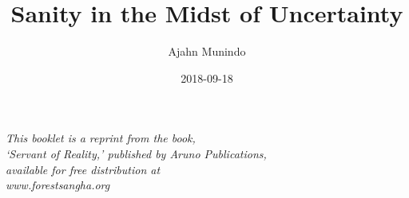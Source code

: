 \documentclass[
  final,
  babelLanguage=british,
]{anecdote}
\title{Sanity in the Midst of Uncertainty}
\subtitle{}
\author{Ajahn Munindo}
\date{2018-09-18}
\begin{document}
\frontmatter

\ifdesktopversion
{}
\fi




%

\clearpage

\mbox{}\thispagestyle{empty}
\vfill

{\centering
\par}

\vfill

{\centering\itshape\fontsize{9}{13}\selectfont
This booklet is a reprint from the book,\\
`Servant of Reality,' published by Aruno Publications,\\
available for free distribution at\\
www.forestsangha.org
\par}

\clearpage\mbox{}\thispagestyle{empty}

\clearpage\mbox{}\thispagestyle{empty}

\mainmatter



\backmatter






\end{document}
